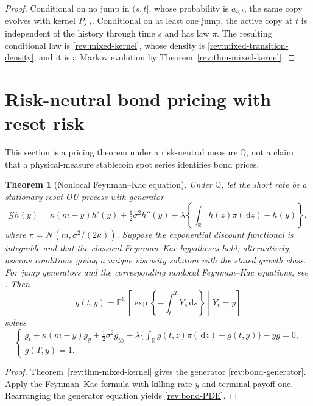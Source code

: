 \documentclass[11pt]{article}
\newtheorem{theorem}[definition]{Theorem}
\theoremstyle{remark}
\newcommand{\E}{\mathbb E}
\newcommand{\Qq}{\mathbb Q}
\newcommand{\R}{\mathbb R}
\newcommand{\dd}{\,\mathrm d}
\newcommand{\Normal}{\mathcal N}
\begin{document}
\begin{proof}
Conditional on no jump in $(s,t]$, whose probability is $a_{s,t}$, the same
copy evolves with kernel $P_{s,t}$.  Conditional on at least one jump, the
active copy at $t$ is independent of the history through time $s$ and has law
$\pi$.  The resulting conditional law is \eqref{rev:mixed-kernel}, whose
density is \eqref{rev:mixed-transition-density}, and it is a
Markov evolution by Theorem~\ref{rev:thm-mixed-kernel}.
\end{proof}

\section{Risk-neutral bond pricing with reset risk}

This section is a pricing theorem under a risk-neutral measure $\Qq$, not a
claim that a physical-measure stablecoin spot series identifies bond prices.

\begin{theorem}[Nonlocal Feynman--Kac equation]
\label{rev:thm-bond-PDE}
Under $\Qq$, let the short rate be a stationary-reset OU process with generator
\begin{equation}
\mathcal Gh(y)=\kappa(m-y)h'(y)+\tfrac12\sigma^2h''(y)
+\lambda\left\{\int_\R h(z)\pi(\dd z)-h(y)\right\},
\label{rev:bond-generator}
\end{equation}
where $\pi=\Normal(m,\sigma^2/(2\kappa))$.  Suppose the exponential discount
functional is integrable and that the classical Feynman--Kac hypotheses hold;
alternatively, assume conditions giving a unique viscosity solution with the
stated growth class.  For jump generators and the corresponding nonlocal
Feynman--Kac equations, see \citet[Chapters~8 and~12]{ContTankov2004}.  Then
\begin{equation}
g(t,y)=\E^{\Qq}\!\left[
\exp\!\left\{-\int_t^TY_s\dd s\right\}\middle|Y_t=y\right]
\label{rev:bond-value}
\end{equation}
solves
\begin{equation}
\begin{cases}
g_t+\kappa(m-y)g_y+\tfrac12\sigma^2g_{yy}
+\lambda\{\int_\R g(t,z)\pi(\dd z)-g(t,y)\}-yg=0,\\
g(T,y)=1.
\end{cases}
\label{rev:bond-PDE}
\end{equation}
\end{theorem}

\begin{proof}
Theorem~\ref{rev:thm-mixed-kernel} gives the generator
\eqref{rev:bond-generator}.  Apply the Feynman--Kac formula with killing rate
$y$ and terminal payoff one.  Rearranging the generator equation yields
\eqref{rev:bond-PDE}.
\end{proof}
\end{document}
